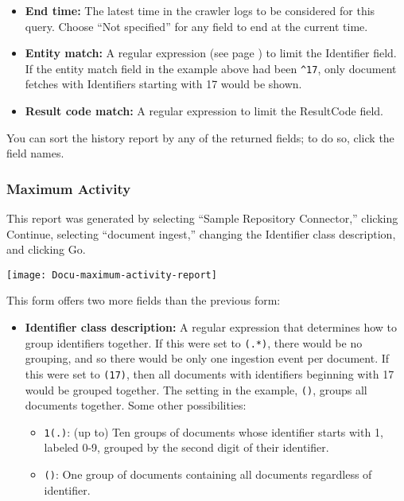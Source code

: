 \begin{changemargin}{1.5in}{0in}
\begin{itemize}
\item \textbf{End time:} The latest time in the crawler logs to be
considered for this query. Choose ``Not specified'' for any field 
to end at the current time.

\item \textbf{Entity match:} A regular expression (see page
\pageref{regex}) to limit the Identifier field. If the entity match
field in the example above had been \texttt{\^{}17}, only document
fetches with Identifiers starting with 17 would be shown.

\item \textbf{Result code match:} A regular expression to limit the
ResultCode field.

\end{itemize}

You can sort the history report by any of the returned fields; to do so,
click the field names.


\subsubsection{Maximum Activity}

This report was generated by selecting ``Sample Repository Connector,''
clicking Continue, selecting ``document ingest,'' changing the Identifier
class description, and clicking Go.

\texttt{[image: Docu-maximum-activity-report]}

This form offers two more fields than the previous form:

\begin{itemize}

\item \textbf{Identifier class description:} A regular expression
that determines how to group identifiers together. If this were set to
\texttt{(.*)}, there would be no grouping, and so there would be only one
ingestion event per document. If this were set to \texttt{(17)},
then all documents with identifiers beginning with 17 would be grouped
together. The setting in the example, \texttt{()}, groups all
documents together. Some other possibilities:

\begin{itemize}

\item \texttt{1(.)}: (up to) Ten groups of documents whose identifier starts
with 1, labeled 0-9, grouped by the second digit of their identifier.

\item \texttt{()}: One group of documents containing all documents 
regardless of identifier.


\end{itemize}
\end{itemize}
\end{changemargin}
